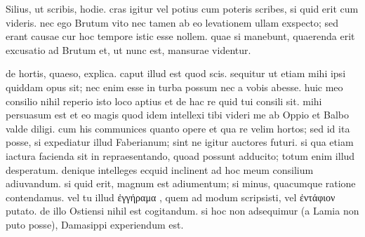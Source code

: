 


 Silius, ut scribis, hodie. cras igitur vel potius cum poteris scribes, si quid erit cum videris. nec ego Brutum vito nec tamen ab eo levationem ullam exspecto; sed erant causae cur hoc tempore istic esse nollem. quae si manebunt, quaerenda erit excusatio ad Brutum et, ut nunc est, mansurae videntur.

 de hortis, quaeso, explica. caput illud est quod scis. sequitur ut etiam mihi ipsi quiddam opus sit; nec enim esse in turba possum nec a vobis abesse. huic meo consilio nihil reperio isto loco aptius et de hac re quid tui consili sit. mihi persuasum est et eo magis quod idem intellexi tibi videri me ab Oppio et Balbo valde diligi. cum his communices quanto opere et qua re velim hortos; sed id ita posse, si expediatur illud Faberianum; sint ne igitur auctores futuri. si qua etiam iactura facienda sit in repraesentando, quoad possunt adducito; totum enim illud desperatum. denique intelleges ecquid inclinent ad hoc meum consilium adiuvandum. si quid erit, magnum est adiumentum; si minus, quacumque ratione contendamus. vel tu illud ἐγγήραμα , quem ad modum scripsisti, vel ἐντάφιον putato. de illo Ostiensi nihil est cogitandum. si hoc non adsequimur (a Lamia non puto posse), Damasippi experiendum est.
